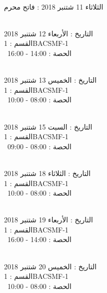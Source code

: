 \par
\noindent\makebox[\linewidth]{\rule{\paperwidth}{0.4pt}}
 \\
الثلاثاء 11 شتنبر 2018 :   فاتح محرم
\par
\noindent\makebox[\linewidth]{\rule{\paperwidth}{0.4pt}}
 \\
التاريخ : الأربعاء 12 شتنبر 2018 \\
القسم : 1BACSMF-1 \\
 \  
الحصة : 14:00 - 16:00 \\
\par
\noindent\makebox[\linewidth]{\rule{\paperwidth}{0.4pt}}
 \\
التاريخ : الخميس 13 شتنبر 2018 \\
القسم : 1BACSMF-1 \\
 \  
الحصة : 08:00 - 10:00 \\
\par
\noindent\makebox[\linewidth]{\rule{\paperwidth}{0.4pt}}
 \\
التاريخ : السبت 15 شتنبر 2018 \\
القسم : 1BACSMF-1 \\
 \  
الحصة : 08:00 - 09:00 \\
\par
\noindent\makebox[\linewidth]{\rule{\paperwidth}{0.4pt}}
 \\
التاريخ : الثلاثاء 18 شتنبر 2018 \\
القسم : 1BACSMF-1 \\
 \  
الحصة : 08:00 - 10:00 \\
\par
\noindent\makebox[\linewidth]{\rule{\paperwidth}{0.4pt}}
 \\
التاريخ : الأربعاء 19 شتنبر 2018 \\
القسم : 1BACSMF-1 \\
 \  
الحصة : 14:00 - 16:00 \\
\par
\noindent\makebox[\linewidth]{\rule{\paperwidth}{0.4pt}}
 \\
التاريخ : الخميس 20 شتنبر 2018 \\
القسم : 1BACSMF-1 \\
 \  
الحصة : 08:00 - 10:00 \\
\par
